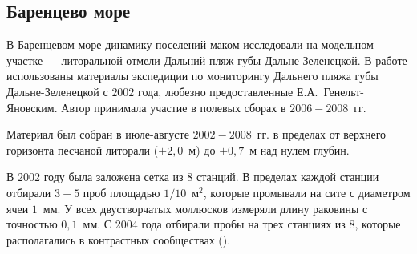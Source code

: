 
\afterpage{\clearpage}

        \subsection{Баренцево море}

В Баренцевом море динамику поселений маком исследовали на модельном участке --- литоральной отмели Дальний пляж губы Дальне-Зеленецкой. 
В работе использованы материалы экспедиции по мониторингу Дальнего пляжа губы Дальне-Зеленецкой с $2002$ года, любезно предоставленные Е.\:А.~Генельт-Яновским.
Автор принимала участие в полевых сборах в $2006 - 2008$~гг.

Материал был собран в июле-августе $2002 - 2008$~гг. в пределах от верхнего горизонта песчаной литорали ($+2,0$~м) до $+0,7$~м над нулем глубин. 

 В $2002$ году была заложена сетка из $8$ станций. 
 В пределах каждой станции отбирали $3 - 5$ проб площадью $1/10$~м$^2$, которые промывали на сите с диаметром ячеи $1$~мм. 
 У всех двустворчатых моллюсков измеряли длину раковины с точностью $0,1$~мм. 
 С 2004 года отбирали пробы на трех станциях из $8$, которые располагались в контрастных сообществах (\cite{Genelt_Dalnezeleneckaya_2008}). 

